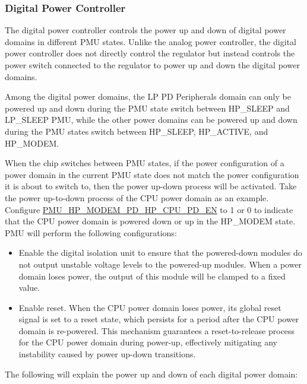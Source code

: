 \documentclass[main\_\_EN.tex]{subfiles}
\begin{document}
\subsubsection{Digital Power Controller}

The digital power controller controls the power up and down of digital power domains in different PMU states. Unlike the analog power controller, the digital power controller does not directly control the regulator but instead controls the power switch connected to the regulator to power up and down the digital power domains.

Among the digital power domains, the LP PD Peripherals domain can only be powered up and down during the PMU state switch between HP\_SLEEP and LP\_SLEEP PMU, while the other power domains can be powered up and down during the PMU states switch between HP\_SLEEP, HP\_ACTIVE, and HP\_MODEM.

When the chip switches between PMU states, if the power configuration of a power domain in the current PMU state does not match the power configuration it is about to switch to, then the power up-down process will be activated. Take the power up-to-down process of the CPU power domain as an example. Configure \hyperref[fielddesc:PMUHPMODEMPDHPCPUPDEN]{PMU\_HP\_MODEM\_PD\_HP\_CPU\_PD\_EN} to 1 or 0 to indicate that the CPU power domain is powered down or up in the HP\_MODEM state. PMU will perform the following configurations:

\begin{itemize}

\item Enable the digital isolation unit to ensure that the powered-down modules do not output unstable voltage levels to the powered-up modules. When a power domain loses power, the output of this module will be clamped to a fixed value.

\item Enable reset. When the CPU power domain loses power, its global reset signal is set to a reset state, which persists for a period after the CPU power domain is re-powered. This mechanism guarantees a reset-to-release process for the CPU power domain during power-up, effectively mitigating any instability caused by power up-down transitions.
\end{itemize}

The following will explain the power up and down of each digital power domain:
\end{document}

